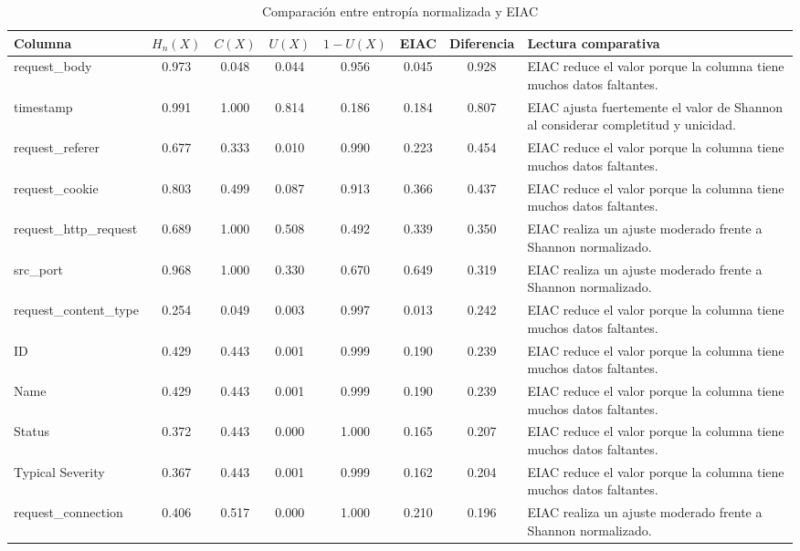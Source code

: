 \begin{table}[h]
\centering
\caption{Comparación entre entropía normalizada y EIAC}
\label{tab:comparacion-hn-eiac-20260624_103725}
\scriptsize
\begin{tabular}{|p{3cm}|c|c|c|c|c|c|p{5cm}|}
\hline
\textbf{Columna} & \textbf{\(H_n(X)\)} & \textbf{\(C(X)\)} & \textbf{\(U(X)\)} & \textbf{\(1-U(X)\)} & \textbf{EIAC} & \textbf{Diferencia} & \textbf{Lectura comparativa} \\
\hline
request\_body & 0.973 & 0.048 & 0.044 & 0.956 & 0.045 & 0.928 & EIAC reduce el valor porque la columna tiene muchos datos faltantes. \\
\hline
timestamp & 0.991 & 1.000 & 0.814 & 0.186 & 0.184 & 0.807 & EIAC ajusta fuertemente el valor de Shannon al considerar completitud y unicidad. \\
\hline
request\_referer & 0.677 & 0.333 & 0.010 & 0.990 & 0.223 & 0.454 & EIAC reduce el valor porque la columna tiene muchos datos faltantes. \\
\hline
request\_cookie & 0.803 & 0.499 & 0.087 & 0.913 & 0.366 & 0.437 & EIAC reduce el valor porque la columna tiene muchos datos faltantes. \\
\hline
request\_http\_request & 0.689 & 1.000 & 0.508 & 0.492 & 0.339 & 0.350 & EIAC realiza un ajuste moderado frente a Shannon normalizado. \\
\hline
src\_port & 0.968 & 1.000 & 0.330 & 0.670 & 0.649 & 0.319 & EIAC realiza un ajuste moderado frente a Shannon normalizado. \\
\hline
request\_content\_type & 0.254 & 0.049 & 0.003 & 0.997 & 0.013 & 0.242 & EIAC reduce el valor porque la columna tiene muchos datos faltantes. \\
\hline
ID & 0.429 & 0.443 & 0.001 & 0.999 & 0.190 & 0.239 & EIAC reduce el valor porque la columna tiene muchos datos faltantes. \\
\hline
Name & 0.429 & 0.443 & 0.001 & 0.999 & 0.190 & 0.239 & EIAC reduce el valor porque la columna tiene muchos datos faltantes. \\
\hline
Status & 0.372 & 0.443 & 0.000 & 1.000 & 0.165 & 0.207 & EIAC reduce el valor porque la columna tiene muchos datos faltantes. \\
\hline
Typical Severity & 0.367 & 0.443 & 0.001 & 0.999 & 0.162 & 0.204 & EIAC reduce el valor porque la columna tiene muchos datos faltantes. \\
\hline
request\_connection & 0.406 & 0.517 & 0.000 & 1.000 & 0.210 & 0.196 & EIAC realiza un ajuste moderado frente a Shannon normalizado. \\

\end{tabular}
\end{table}

